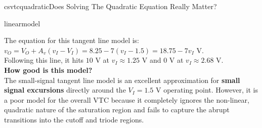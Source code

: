 \begin{mainquestion}{csvtcquadratic}{Does Solving The Quadratic Equation Really Matter?}
\begin{partquestion}{linearmodel}
\begin{answer}[3in]
        The equation for this tangent line model is: \\
        $v_O = V_O + A_v(v_I - V_I) = 8.25 - 7(v_I - 1.5) = 18.75 - 7v_I \text{ V}$. \\
        Following this line, it hits $10 \text{ V}$ at $v_I \approx 1.25 \text{ V}$ and $0 \text{ V}$ at $v_I \approx 2.68 \text{ V}$. \\
        
        \textbf{How good is this model?} \\
        The small-signal tangent line model is an excellent approximation for \textbf{small signal excursions} directly around the $V_I = 1.5 \text{ V}$ operating point. However, it is a poor model for the overall VTC because it completely ignores the non-linear, quadratic nature of the saturation region and fails to capture the abrupt transitions into the cutoff and triode regions.
\end{answer}

\end{partquestion}

\end{mainquestion}
